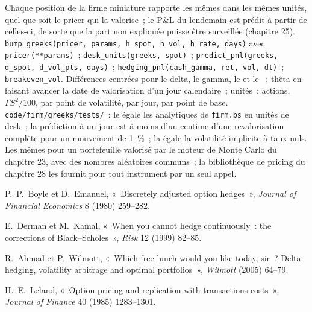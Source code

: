 \begin{build}
 Chaque position de la firme miniature rapporte les mêmes  dans
les mêmes unités, quel que soit le pricer qui la valorise~; le P\&L du lendemain est prédit à partir
de celles-ci, de sorte que la part non expliquée puisse être surveillée (chapitre 25). 
\texttt{bump\_greeks(pricer, params, h\_spot, h\_vol, h\_rate,
days)} avec \texttt{pricer(**params)}~; \texttt{desk\_units(greeks, spot)}~;
\texttt{predict\_pnl(greeks, d\_spot, d\_vol\_pts, days)}~;
\texttt{hedging\_pnl(cash\_gamma, ret, vol, dt)}~; \texttt{breakeven\_vol}.
 Différences centrées pour le delta, le gamma, le  et le ~; thêta en faisant avancer la
date de valorisation d'un jour calendaire~; unités~: actions, $\Gamma S^2/100$, par point de
volatilité, par jour, par point de base.
 \texttt{code/firm/greeks/tests/}~: le  égale
les  analytiques de \texttt{firm.bs} en unités de desk~; la prédiction à un jour est
à moins d'un centime d'une revalorisation complète pour un mouvement de 1~\%~; la 
égale la volatilité implicite à taux nuls.
 Les mêmes  pour un portefeuille valorisé par le moteur de Monte Carlo du
chapitre 23, avec des nombres aléatoires communs~; la bibliothèque de pricing du chapitre 28 les fournit
pour tout instrument par un seul appel.
\end{build}

\begin{omsources}
\item P.~P.~Boyle et D.~Emanuel, «~Discretely adjusted option hedges~»,
\emph{Journal of Financial Economics} 8 (1980) 259--282.
\item E.~Derman et M.~Kamal, «~When you cannot hedge continuously~: the
corrections of Black--Scholes~», \emph{Risk} 12 (1999) 82--85.
\item R.~Ahmad et P.~Wilmott, «~Which free lunch would you like today, sir~?
Delta hedging, volatility arbitrage and optimal portfolios~», \emph{Wilmott}
(2005) 64--79.
\item H.~E.~Leland, «~Option pricing and replication with transactions costs~»,
\emph{Journal of Finance} 40 (1985) 1283--1301.
\end{omsources}

